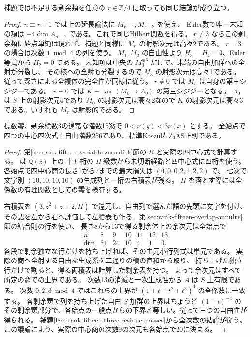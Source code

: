 \begin{corollary}
補題では不足する剰余類を任意の $r\in\mathbb Z/4$ に取っても同じ結論が成り立つ。
\end{corollary}
\begin{proof}
$n\equiv r+1$ では上の延長論法に $M_{r+1},M_{r+2}$ を使え、
Euler数で唯一未知の項は $-4\dim A_{n-1}$ である。これで同じHilbert関数を得る。
$r\ne3$ ならこの剰余類に始点単純は現れず、補題と同様に $M_r$ の射影次元は高々2である。
$r=3$ の場合は次数 $1\bmod4$ の列を使う。
$M_1,M_2$ の自由性より $H_3=H_4=0$、Euler等式から $H_2=0$ である。
未知項は中央の $M_3^{\oplus6}$ だけで、末端の自由加群への全射が分裂し、
その核への全射も分裂するので $M_3$ の射影次元は高々1である。
従って深さによる全複体の完全性が同様に従う。
$r\ne0$ では $M_r$ は自身の第三シジジーである。
$r=0$ では $K=\ker(M_0\to A_0)$ の第三シジジーとなる。
$A_0$ は $S$ 上の射影次元4であり $M_0$ の射影次元は高々2なので
$K$ の射影次元は高々3である。いずれも $M_r$ は射影的である。
\end{proof}
\begin{theorem}\label{thm:rank-fifteen-full-trace-disk}
標数零、剰余標数3の通常な階数15窓で $0<\nu(y)<3\nu(x)$ とする。
全始点で四つの中心四次式上自由階数256であり、標準Koszul左右AS正則である。
\end{theorem}
\begin{proof}
第\ref{sec:rank-fifteen-variable-zero-disk}節の $R$ と実際の四中心式で計算する。
 は $\mathbb Q(z)$ 上の
十五桁の $H$ 級数から未切断経路と四中心式に四桁を使う。
各始点で四中心商の長さ1から7までの最大損失は $(0,0,0,2,4,2,2)$ で、
七次で文字別 $(10,10,10,10)$ の生成列と一桁の右積表が残る。
$H$ を落とす際には全係数の有理関数としての零を検査する。

右積表を $(3,z^2+z+2,H)$ で還元し、自由列で選んだ語の先頭に文字を付け、
その語を左から右へ評価して左積表も作る。第\ref{sec:rank-fifteen-overlap-annulus}節の結合則の行を使い、
長さ8から13で得る剰余体上の余次元は全始点で
\[
\begin{array}{c|cccccc}
 n&8&9&10&11&12&13\\ \hline
 \dim&31&24&10&4&1&0 .
\end{array}
\]
各段で剰余独立な行だけを持ち上げれば、その主元小行列式は単元である。
実際の商へ全射する自由な生成系を二通りの積の直和から取り、
持ち上げた独立行だけで割ると、得る両積表は計算した剰余表を持つ。
よって余次元はすべて所定の窓での上界である。
次数13の消滅と一次生成性から $A$ は $S$ 上有限である。
次数 $0,2,3\bmod4$ ではこれらの上界が $(1+t+t^2+t^3)^4$ の全係数に一致する。
各剰余類で列を持ち上げた自由 $S$ 加群の上界はちょうど $(1-t)^{-4}$ の
その剰余類部分で、各始点の一般点からの下界と等しい。従って三つの自由性が得られる。
補題\ref{lem:rank-fifteen-three-residue-classes}から全次数の結論が従う。
この議論により、実際の中心商の次数9の次元も各始点で20に決まる。
\end{proof}
